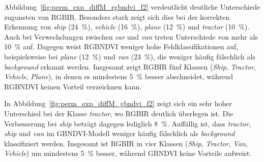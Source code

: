 %     

Abbildung~\ref{fig:perm_exp_diffM_rgbndvi_f2} verdeutlicht deutliche Unterschiede zugunsten von RGBIR. Besonders stark zeigt sich dies bei der korrekten Erkennung von \textit{ship} (24~\%), \textit{vehicle} (16~\%), \textit{plane} (12~\%) und \textit{tractor} (10~\%). Auch bei Verwechslungen zwischen \textit{car} und \textit{van} treten Unterschiede von mehr als 10~\% auf. Dagegen weist RGBNDVI weniger hohe Fehlklassifikationen auf, beispielsweise bei \textit{plane} (12~\%) und \textit{van} (23~\%), die weniger häufig fälschlich als \textit{background} erkannt werden. Insgesamt zeigt RGBIR fünf Klassen (\textit{Ship}, \textit{Tractor}, \textit{Vehicle}, \textit{Plane}), in denen es mindestens 5~\% besser abschneidet, während RGBNDVI keinen Vorteil verzeichnen kann.

%     

In Abbildung~\ref{fig:perm_exp_diffM_gbndvi_f2} zeigt sich ein sehr hoher Unterschied bei der Klasse \textit{tractor}, wo RGBIR deutlich überlegen ist. Die Verbesserung bei \textit{ship} beträgt dagegen lediglich 8~\%. Auffällig ist, dass \textit{tractor}, \textit{ship} und \textit{van} im GBNDVI-Modell weniger häufig fälschlich als \textit{background} klassifiziert werden. Insgesamt ist RGBIR in vier Klassen (\textit{Ship}, \textit{Tractor}, \textit{Van}, \textit{Vehicle}) um mindestens 5~\% besser, während GBNDVI keine Vorteile aufweist.

%     

